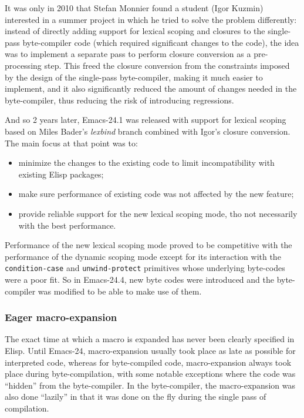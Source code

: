 \documentclass[format=acmsmall, review=false, screen=true]{acmart}
\newcommand \Elisp {Elisp}
\begin{document}
It was only in 2010 that Stefan Monnier found a student (Igor Kuzmin)
interested in a summer project in which he tried to solve the problem
differently: instead of directly adding support for lexical scoping and
closures to the single-pass byte-compiler code (which required significant
changes to the code), the idea was to implement a separate pass to perform
closure conversion as a pre-processing step.  This freed the closure
conversion from the constraints imposed by the design of the single-pass
byte-compiler, making it much easier to implement, and it also significantly
reduced the amount of changes needed in the byte-compiler, thus reducing the
risk of introducing regressions.

And so 2 years later, Emacs-24.1 was released with support for lexical
scoping based on Miles Bader's \emph{lexbind} branch combined with Igor's
closure conversion.  The main focus at that point was to:
\begin{itemize}
\item minimize the changes to the existing code to limit incompatibility
  with existing \Elisp{} packages;
\item make sure performance of existing code was not affected by the
  new feature;
\item provide reliable support for the new lexical scoping mode, tho not
  necessarily with the best performance.
\end{itemize}

Performance of the new lexical scoping mode proved to be competitive
with the performance of the dynamic scoping mode except for its interaction
with the \texttt{condition-case} and \texttt{unwind-protect} primitives
whose underlying byte-codes were a poor fit.  So in Emacs-24.4, new byte
codes were introduced and the byte-compiler was modified to be able to make
use of them.

\subsubsection{Eager macro-expansion} %

The exact time at which a macro is expanded has never been clearly specified
in \Elisp{}.  Until Emacs-24, macro-expansion usually took place as late as
possible for interpreted code, whereas for byte-compiled code,
macro-expansion always took place during byte-compilation, with some notable
exceptions where the code was ``hidden'' from the byte-compiler.  In the
byte-compiler, the macro-expansion was also done ``lazily'' in that it was
done on the fly during the single pass of compilation.
\end{document}
